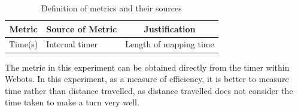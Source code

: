 \documentclass[conference]{IEEEtran}
\begin{document}
\begin{table}[htbp]
\centering
\setlength{\abovecaptionskip}{0.cm}
\caption{Definition of metrics and their sources}
\label{Table1}
\begin{tabular}{c|l|c}
\hline
Metric                & \multicolumn{1}{c|}{Source of Metric} & Justification     \\ \hline
Time(s)               & Internal timer            & Length of mapping time \\ \hline
\end{tabular}
\end{table}

The metric in this experiment can be obtained directly from the timer within Webots. In this experiment, as a measure of efficiency, it is better to measure time rather than distance travelled, as distance travelled does not consider the time taken to make a turn very well. 
\end{document}
